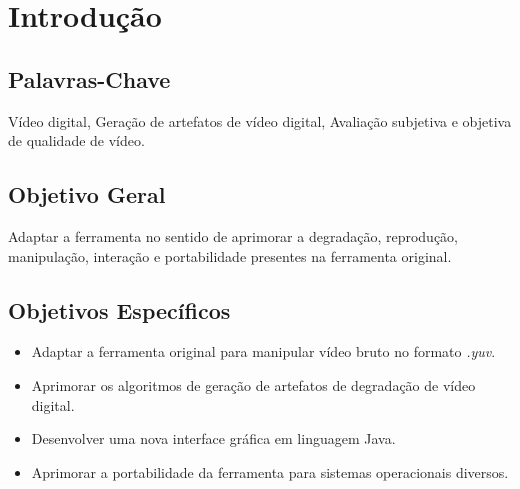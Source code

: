 \chapter{Introdução}

\section{Palavras-Chave}
Vídeo digital, Geração de artefatos de vídeo digital, Avaliação subjetiva e objetiva de qualidade de vídeo.
\section{Objetivo Geral}
Adaptar a ferramenta  no sentido de aprimorar a degradação, reprodução, manipulação, interação e portabilidade  presentes na ferramenta original.
\section{Objetivos Específicos}
\begin{itemize}
	\item \textbf{} Adaptar a ferramenta original para manipular vídeo bruto no formato \emph{.yuv}.
	\item \textbf{} Aprimorar os algoritmos de geração de artefatos de degradação de vídeo digital.
	\item \textbf{} Desenvolver uma nova interface gráfica em linguagem Java.
	\item \textbf{} Aprimorar a portabilidade da ferramenta para sistemas operacionais diversos.
\end{itemize}
